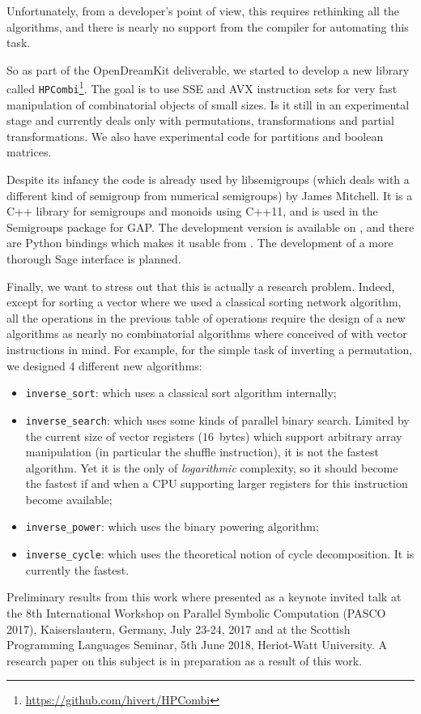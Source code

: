 \documentclass{deliverablereport}
\begin{document}
Unfortunately, from a developer's
point of view, this requires rethinking all the
algorithms, and there is nearly no support from the compiler for automating
this task.\bigskip

So as part of the OpenDreamKit deliverable, we started to develop a new
library called \texttt{HPCombi}\footnote{\url{https://github.com/hivert/HPCombi}}. The
goal is to use SSE and AVX instruction sets for very fast manipulation of
combinatorial objects of small sizes. Is it still in an experimental stage and
currently deals only with permutations, transformations and partial
transformations. We also have experimental code for partitions and boolean
matrices.

Despite its infancy the code is already used by libsemigroups
\cite{libsemigroups} (which deals with a different kind of semigroup from
numerical semigroups) by James Mitchell. It is a C++ library for semigroups and
monoids using C++11, and is used in the Semigroups
package for GAP. The development version is available on \GitHub, and there are
Python bindings which makes it usable from \Sage. The development of a more
thorough Sage interface is planned.
\bigskip

Finally, we want to stress out that this is actually a research
problem. Indeed, except for sorting a vector where we used a classical sorting
network algorithm, all the operations in the previous table of operations require the design
of a new algorithms as nearly no combinatorial algorithms where conceived of with
vector instructions in mind. For example, for the simple task of inverting a
permutation, we designed 4 different new algorithms:
\begin{itemize}
\item \verb|inverse_sort|: which uses a classical sort algorithm internally;
\item \verb|inverse_search|: which uses some kinds of parallel binary
  search. Limited by the current size of vector registers ($16$~bytes) which support
  arbitrary array manipulation (in particular the shuffle instruction), it is
  not the fastest algorithm. Yet it is the only of {\em logarithmic} complexity,
  so it should become the fastest if and when a CPU supporting larger registers
  for this instruction become available;
\item \verb|inverse_power|: which uses the binary powering algorithm;
\item \verb|inverse_cycle|: which uses the theoretical notion of cycle
  decomposition. It is currently the fastest.
\end{itemize}
Preliminary results from this work where presented as a keynote invited talk at
the 8th International Workshop on Parallel Symbolic Computation (PASCO 2017),
Kaiserslautern, Germany, July 23-24, 2017 and at the Scottish Programming
Languages Seminar, 5th June 2018, Heriot-Watt University. A research paper on
this subject is in preparation as a result of this work.
\end{document}
